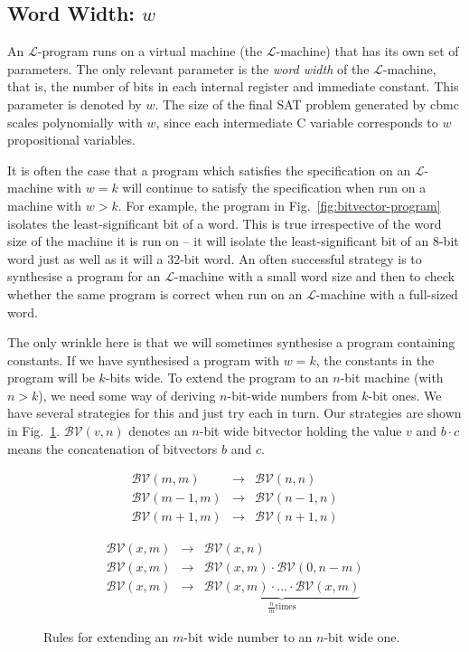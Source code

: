 \documentclass[a4paper]{llncs}
\newcommand{\bv}[2]{\mathcal{BV}(#1, #2)}
\begin{document}
\subsection{Word Width: $w$}
An $\mathcal{L}$-program runs on a virtual machine (the $\mathcal{L}$-machine) that
has its own set of parameters.  The only relevant parameter is
the \emph{word width} of the $\mathcal{L}$-machine, that is, the number of bits
in each internal register and immediate constant.  This parameter is denoted by
$w$.  The size of the final SAT problem generated by {\sc cbmc} scales
polynomially with $w$, since each intermediate C variable corresponds
to $w$ propositional variables.

It is often the case that a program which satisfies the specification
on an $\mathcal{L}$-machine with $w = k$ will continue to satisfy the
specification when run on a machine with $w > k$.  For example, the program
in Fig.~\ref{fig:bitvector-program} isolates the least-significant bit of a word.
This is true irrespective of the word size of the machine it is run on -- it will
isolate the least-significant bit of an 8-bit word just as well as it will a
32-bit word.  An often successful strategy is to synthesise a program for an
$\mathcal{L}$-machine with a small word size and then to check whether the
same program is correct when run on an $\mathcal{L}$-machine with a
full-sized word.

The only wrinkle here is that we will sometimes synthesise a program containing
constants.  If we have synthesised a program with $w=k$,
the constants in the program will be $k$-bits wide.  To extend the program
to an $n$-bit machine (with $n > k$), we need some way of deriving $n$-bit-wide
numbers from $k$-bit ones.  We have several strategies for this and
just try each in turn.  Our strategies are shown in Fig.~\ref{fig:generalize}.
$\mathcal{BV}(v, n)$ denotes an $n$-bit wide bitvector holding the value $v$
and $b \cdotp c$ means the concatenation of bitvectors $b$ and $c$.

\begin{figure}

\centering
\begin{minipage}[t]{.45\textwidth}
\begin{eqnarray*}
 \bv{m}{m} & \rightarrow & \bv{n}{n} \\
 \bv{m-1}{m} & \rightarrow & \bv{n-1}{n} \\
 \bv{m+1}{m} & \rightarrow & \bv{n+1}{n}
\end{eqnarray*}
\end{minipage}
\begin{minipage}[t]{.45\textwidth}
\begin{eqnarray*}
 \bv{x}{m} & \rightarrow & \bv{x}{n} \\
 \bv{x}{m} & \rightarrow & \bv{x}{m} \cdotp \bv{0}{n - m} \\
 \bv{x}{m} & \rightarrow & \underbrace{\bv{x}{m} \cdotp \ldots \cdotp \bv{x}{m}}_{\frac{n}{m} \mathrm{ times}}
\end{eqnarray*}
\end{minipage}

\caption{Rules for extending
an $m$-bit wide number to an $n$-bit wide one.
 \label{fig:generalize}}
\end{figure}
\end{document}
